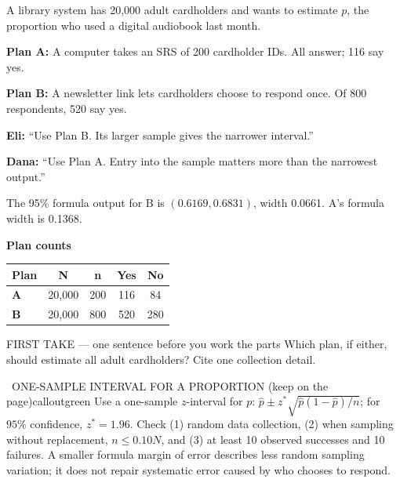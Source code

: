 \documentclass[11pt]{article}
\begin{document}
\clearpage
{}

A library system has 20,000 adult cardholders and wants to estimate $p$, the proportion who used a digital audiobook last month.\par\smallskip \textbf{Plan A:} A computer takes an SRS of 200 cardholder IDs. All answer; 116 say yes.\par \textbf{Plan B:} A newsletter link lets cardholders choose to respond once. Of 800 respondents, 520 say yes.\par\smallskip \textbf{Eli:} ``Use Plan B. Its larger sample gives the narrower interval.''\par \textbf{Dana:} ``Use Plan A. Entry into the sample matters more than the narrowest output.''\par\smallskip The 95\% formula output for B is $(0.6169,0.6831)$, width 0.0661. A's formula width is 0.1368.\par
\begin{center}
\textbf{Plan counts}\par\smallskip
\begin{tabular}{|l|c|c|c|c|}
\hline
\textbf{Plan} & \textbf{N} & \textbf{n} & \textbf{Yes} & \textbf{No} \\ \hline
\textbf{A} & 20,000 & 200 & 116 & 84 \\ \hline
\textbf{B} & 20,000 & 800 & 520 & 280 \\ \hline
\end{tabular}
\end{center}
\begin{firsttakebox}{FIRST TAKE --- one sentence before you work the parts}
Which plan, if either, should estimate all adult cardholders? Cite one collection detail.\par
{}
\end{firsttakebox}

\begin{callout}{\IconBook\ ONE-SAMPLE INTERVAL FOR A PROPORTION (keep on the page)}{calloutgreen}
Use a one-sample $z$-interval for $p$: $\hat p\pm z^*\sqrt{\hat p(1-\hat p)/n}$;
for $95\%$ confidence, $z^*=1.96$. Check (1) random data collection, (2) when sampling
without replacement, $n\le 0.10N$, and (3) at least 10 observed successes and 10 failures.
A smaller formula margin of error describes less random sampling variation; it does not repair
systematic error caused by who chooses to respond.
\end{callout}
\end{document}
